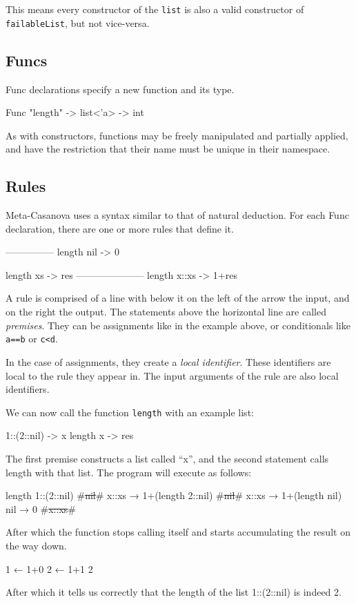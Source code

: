 \noindent
This means every constructor of the \verb|list| is also a valid constructor of \verb|failableList|, but not vice-versa.

\subsection{Funcs}
Func declarations specify a new function and its type.

\begin{code}
Func "length" -> list<'a> -> int
\end{code}

As with constructors, functions may be freely manipulated and partially applied, and have the restriction that their name must be unique in their namespace.

\subsection{Rules}
Meta-Casanova uses a syntax similar to that of natural deduction.
For each Func declaration, there are one or more rules that define it.

\begin{code}
---------------
length nil -> 0

length xs -> res
---------------------
length x::xs -> 1+res
\end{code}

A rule is comprised of a line with below it on the left of the arrow the input, and on the right the output.
The statements above the horizontal line are called \textit{premises}\label{premises}.
They can be assignments like in the example above, or conditionals like \verb|a==b| or \verb|c<d|.

In the case of assignments, they create a \textit{local identifier}.
These identifiers are local to the rule they appear in.
The input arguments of the rule are also local identifiers.

We can now call the function \verb|length| with an example list:

\begin{code}
  1::(2::nil) -> x
  length x    -> res
\end{code}

The first premise constructs a list called ``x'', and the second statement calls length with that list.
The program will execute as follows:

\begin{code}
length 1::(2::nil)
    #\st{nil}#
    x::xs → 1+(length 2::nil)
        #\st{nil}#
        x::xs → 1+(length nil)
            nil → 0
            #\st{x::xs}#
\end{code}

\noindent
After which the function stops calling itself and starts accumulating the result on the way down.

\begin{code}[gobble=2]
        1 ← 1+0
    2 ← 1+1
2
\end{code}

\noindent
After which it tells us correctly that the length of the list 1::(2::nil) is indeed 2.
